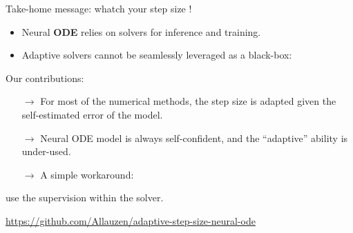 \documentclass{EESD}
\begin{document}
\begin{frame}{Take-home message: whatch your step size !}
  \begin{itemize}
  \item Neural \textbf{ODE} relies on
    solvers for inference and training. 
  \item  Adaptive solvers cannot be seamlessly
    leveraged as a black-box: %
  \end{itemize}
  \begin{alertblock}{Our contributions:}
    \begin{itemize}
    \item[$\rightarrow$] For most of the numerical methods, the step size is adapted given the self-estimated error of the model.
    \item[$\rightarrow$] Neural ODE model is always self-confident, and the ``adaptive'' ability is under-used. 
    \item[$\rightarrow$] A simple workaround:
    \end{itemize}
  \begin{center}
    use the supervision within the solver.
  \end{center}
      \hfill\url{https://github.com/Allauzen/adaptive-step-size-neural-ode}
  \end{alertblock}
\end{frame}

\breakingframe{
\begin{textblock*}{15cm}(1.8cm,4cm)
\Huge\textbf{\textcolor{black}{Thank you for your attention!}}
\end{textblock*}
}


\end{document}
